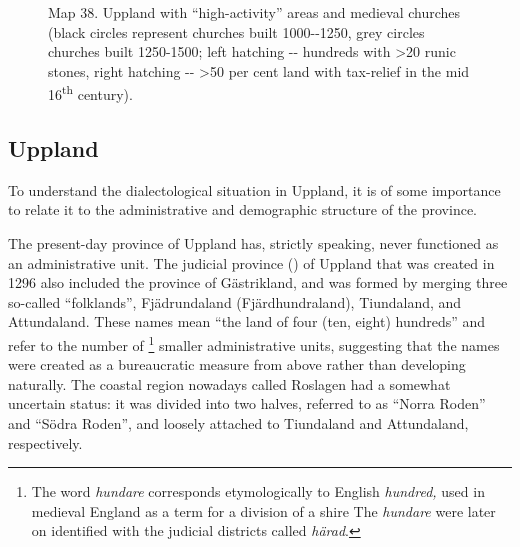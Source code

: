 \begin{figure}[h]

\begin{minipage}{4.96875in}

\label{bkm:Ref130722360}Map 38. Uppland with “high-activity” areas  and medieval churches (black circles represent churches built 1000-{}-1250, grey circles churches built 1250-1500; left hatching  {}-{}- hundreds with {\textgreater}20 runic stones, right hatching  {}-{}- {\textgreater}50 per cent land with tax-relief in the mid 16\textsuperscript{th} century).


\end{minipage}

\end{figure}

\subsection{Uppland}

To understand the dialectological situation in Uppland, it is of some importance to relate it to the administrative and demographic structure of the province.


The present-day province of Uppland has, strictly speaking, never functioned as an administrative unit. The judicial province () of Uppland that was created in 1296 also included the province of Gästrikland, and was formed by merging three so-called “folklands”, Fjädrundaland (Fjärdhundraland), Tiundaland, and Attundaland. These names mean “the land of four (ten, eight) hundreds” and refer to the number of \textstyleLinguisticExample{,}\footnote{ The word \textit{hundare} corresponds etymologically to English \textit{hundred}\textit{,} used in medieval England as a term for a division of a shire The \textit{hundare} were later on identified with the judicial districts called \textit{härad}.} smaller administrative units, suggesting that the names were created as a bureaucratic measure from above rather than developing naturally. The coastal region nowadays called Roslagen had a somewhat uncertain status: it was divided into two halves, referred to as “Norra Roden” and “Södra Roden”, and loosely attached to Tiundaland and Attundaland, respectively. 

